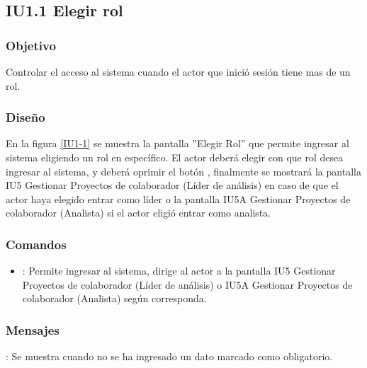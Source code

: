 \subsection{IU1.1 Elegir rol}

\subsubsection{Objetivo}
	Controlar el acceso al sistema cuando el actor que inició sesión tiene mas de un rol.

\subsubsection{Diseño}
	En la figura \ref{IU1-1} se muestra la pantalla ''Elegir Rol'' que permite ingresar al sistema eligiendo un rol en específico. El actor deberá elegir con que rol desea ingresar al sistema, y deberá oprimir el botón , finalmente se mostrará la pantalla IU5 Gestionar Proyectos de colaborador (Líder de análisis) en caso de que el actor haya elegido entrar como líder o la pantalla IU5A Gestionar Proyectos de colaborador (Analista) si el actor eligió entrar como analista. 

\label{IU1-1}
\subsubsection{Comandos}
\begin{itemize}
	\item {}: Permite ingresar al sistema, dirige al actor a la pantalla IU5 Gestionar Proyectos de colaborador (Líder de análisis) o IU5A Gestionar Proyectos de colaborador (Analista) según corresponda.
\end{itemize}

\subsubsection{Mensajes}

\begin{Citemize}
	\item {}: Se muestra cuando no se ha ingresado un dato marcado como obligatorio.
\end{Citemize}

